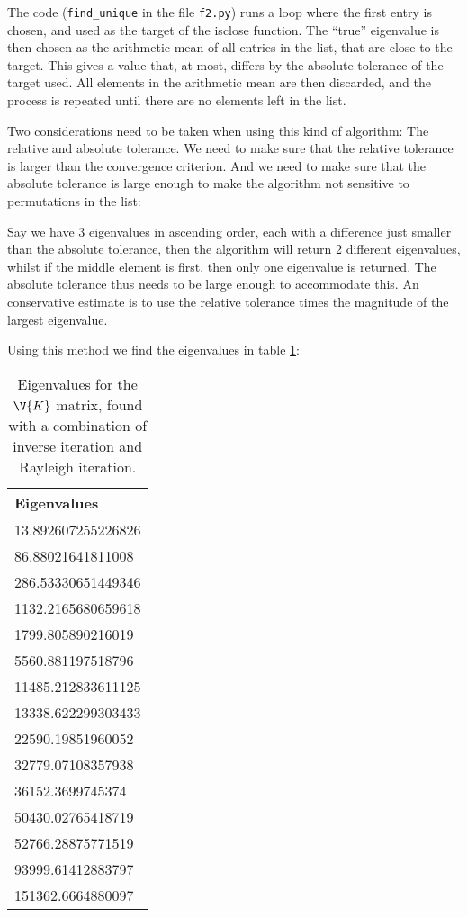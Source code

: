 \documentclass[a4paper,10pt]{article}
\begin{document}
	The code (\texttt{find\_unique} in the file \texttt{f2.py}) runs a loop where the first entry is chosen, and used as the target of the isclose function. The ``true'' eigenvalue is then chosen as the arithmetic mean of all entries in the list, that are close to the target. This gives a value that, at most, differs by the absolute tolerance of the target used. All elements in the arithmetic mean are then discarded, and the process is repeated until there are no elements left in the list.
	
	Two considerations need to be taken when using this kind of algorithm: The relative and absolute tolerance. We need to make sure that the relative tolerance is larger than the convergence criterion. And we need to make sure that the absolute tolerance is large enough to make the algorithm not sensitive to permutations in the list:
	
	Say we have 3 eigenvalues in ascending order, each with a difference just smaller than the absolute tolerance, then the algorithm will return 2 different eigenvalues, whilst if the middle element is first, then only one eigenvalue is returned. The absolute tolerance thus needs to be large enough to accommodate this. An conservative estimate is to use the relative tolerance times the magnitude of the largest eigenvalue.
	
	Using this method we find the eigenvalues in table \ref{tab:K_eigs}:
	
	\begin{table}[H]
		\centering
		\begin{tabular}{l}
			Eigenvalues \\
			\hline
			13.892607255226826\\
			86.88021641811008 \\
			286.53330651449346\\
			1132.2165680659618\\
			1799.805890216019 \\
			5560.881197518796 \\
			11485.212833611125\\
			13338.622299303433\\
			22590.19851960052 \\
			32779.07108357938 \\
			36152.3699745374  \\
			50430.02765418719 \\
			52766.28875771519 \\
			93999.61412883797 \\
			151362.6664880097
		\end{tabular}
		\caption{Eigenvalues for the $ \V{K} $ matrix, found with a combination of inverse iteration and Rayleigh iteration.}
		\label{tab:K_eigs}
	\end{table}
	
\end{document}
